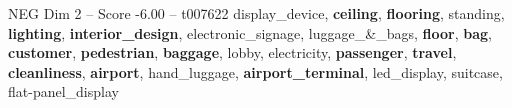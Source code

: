\begin{textsample}{NEG Dim 2 – Score -6.00 – t007622}  \label{ex:f2_neg_005}
display\_device, \textbf{ceiling}, \textbf{flooring}, standing, \textbf{lighting}, \textbf{interior\_design}, electronic\_signage, luggage\_\&\_bags, \textbf{floor}, \textbf{bag}, \textbf{customer}, \textbf{pedestrian}, \textbf{baggage}, lobby, electricity, \textbf{passenger}, \textbf{travel}, \textbf{cleanliness}, \textbf{airport}, hand\_luggage, \textbf{airport\_terminal}, led\_display, suitcase, flat-panel\_display

\end{textsample}
